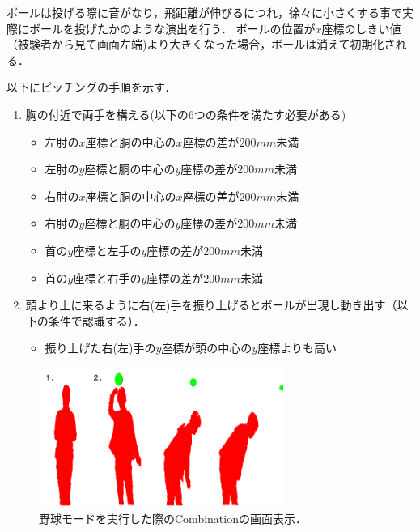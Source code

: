 ボールは投げる際に音がなり，飛距離が伸びるにつれ，徐々に小さくする事で実際にボールを投げたかのような演出を行う．
ボールの位置が$x$座標のしきい値（被験者から見て画面左端)より大きくなった場合，ボールは消えて初期化される．


\clearpage

以下にピッチングの手順を示す．

\begin{enumerate}
    \item 胸の付近で両手を構える(以下の6つの条件を満たす必要がある)
        \begin{itemize}
            \item 左肘の$x$座標と胴の中心の$x$座標の差が$200mm$未満
            \item 左肘の$y$座標と胴の中心の$y$座標の差が$200mm$未満
            \item 右肘の$x$座標と胴の中心の$x$座標の差が$200mm$未満
            \item 右肘の$y$座標と胴の中心の$y$座標の差が$200mm$未満
            \item 首の$y$座標と左手の$y$座標の差が$200mm$未満
            \item 首の$y$座標と右手の$y$座標の差が$200mm$未満
        \end{itemize}
    \item 頭より上に来るように右(左)手を振り上げるとボールが出現し動き出す（以下の条件で認識する）．
        \begin{itemize}
            \item 振り上げた右(左)手の$y$座標が頭の中心の$y$座標よりも高い
        \end{itemize}
\end{enumerate}


\vspace{1cm}
\begin{figure}[h]
    \centering
    \includegraphics[width=8cm]{image/baseball.png}
    \caption[野球モードを実行した際のCombinationの画面表示]{野球モードを実行した際のCombinationの画面表示．}
  \label{baseball}
\end{figure}
\vspace{1cm}


